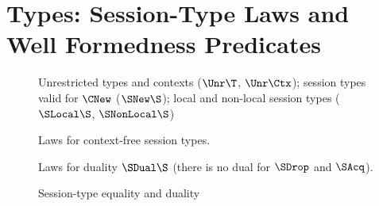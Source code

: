 \clearpage

\section{Types: Session-Type Laws and Well Formedness Predicates}
\label{sec:appendix-types}

\begin{figure}[h]
  \caption{Unrestricted types and contexts ($\Unr\T$, $\Unr\Ctx$); session
    types valid for $\CNew$ ($\SNew\S$); local and non-local session types
    ($\SLocal\S$, $\SNonLocal\S$)}
  \label{fig:omitted-predicates}
\end{figure}

\vfill

\begin{figure}[h]
  \medskip
  Laws for context-free session types.

  \medskip
  Laws for duality $\SDual\S$ (there is no dual for $\SDrop$ and $\SAcq$).
  \caption{Session-type equality and duality}
  \label{fig:session-laws}
\end{figure}

